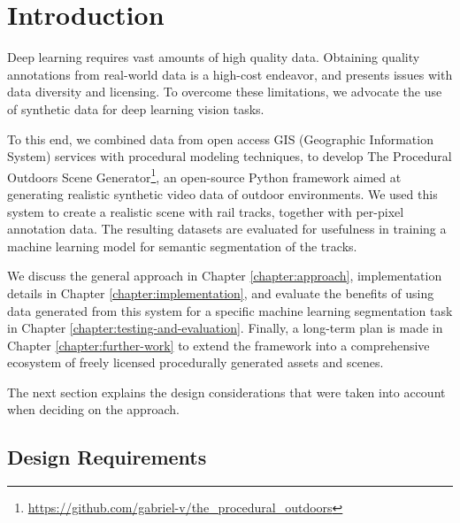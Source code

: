 \chapter{Introduction}
\label{chapter:intro}

Deep learning requires vast amounts of high quality data\cite{korakakis2018short}. Obtaining quality annotations from real-world data is a high-cost endeavor, and presents issues with data diversity and licensing\cite{asano2021pass}. To overcome these limitations, we advocate the use of synthetic data for deep learning vision tasks.

To this end, we combined data from open access GIS (Geographic Information System) services with procedural modeling techniques, to develop The Procedural Outdoors Scene Generator\footnote{\url{https://github.com/gabriel-v/the_procedural_outdoors}}, an open-source Python framework aimed at generating realistic synthetic video data of outdoor environments. We used this system to create a realistic scene with rail tracks, together with per-pixel annotation data. The resulting datasets are evaluated for usefulness in training a machine learning model for semantic segmentation of the tracks.

We discuss the general approach in Chapter \ref{chapter:approach}, implementation details in Chapter \ref{chapter:implementation}, and evaluate the benefits of using data generated from this system for a specific machine learning segmentation task in Chapter \ref{chapter:testing-and-evaluation}. Finally, a long-term plan is made in Chapter \ref{chapter:further-work} to extend the framework into a comprehensive ecosystem of freely licensed procedurally generated assets and scenes.

The next section explains the design considerations that were taken into account when deciding on the approach.

\section{Design Requirements}
\label{sec:design-requirements}


